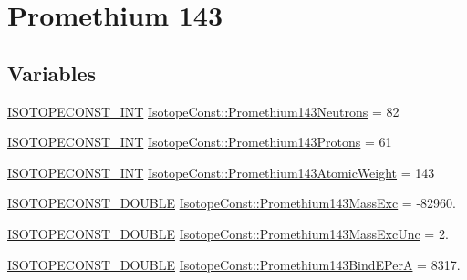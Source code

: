 \hypertarget{group___isotope_const-_promethium-_pm143}{}\section{Promethium 143}
\label{group___isotope_const-_promethium-_pm143}
\subsection*{Variables}
\begin{DoxyCompactItemize}
\item 
\mbox{\hyperlink{group___isotope_const-_macros_ga5f18360b3e99483a35c32d789e62621c}{I\+S\+O\+T\+O\+P\+E\+C\+O\+N\+S\+T\+\_\+\+I\+NT}} \mbox{\hyperlink{group___isotope_const-_promethium-_pm143_ga95c44e6529e52cbad17c35234598233a}{Isotope\+Const\+::\+Promethium143\+Neutrons}} = 82
\item 
\mbox{\hyperlink{group___isotope_const-_macros_ga5f18360b3e99483a35c32d789e62621c}{I\+S\+O\+T\+O\+P\+E\+C\+O\+N\+S\+T\+\_\+\+I\+NT}} \mbox{\hyperlink{group___isotope_const-_promethium-_pm143_ga49a61bb77ef2f5d0c76c5df9083b4a56}{Isotope\+Const\+::\+Promethium143\+Protons}} = 61
\item 
\mbox{\hyperlink{group___isotope_const-_macros_ga5f18360b3e99483a35c32d789e62621c}{I\+S\+O\+T\+O\+P\+E\+C\+O\+N\+S\+T\+\_\+\+I\+NT}} \mbox{\hyperlink{group___isotope_const-_promethium-_pm143_gaa507a319735b05d2bf0e0d992bcd7c50}{Isotope\+Const\+::\+Promethium143\+Atomic\+Weight}} = 143
\item 
\mbox{\hyperlink{group___isotope_const-_macros_ga8f45a7272ce02c0b4c65c44636ed719a}{I\+S\+O\+T\+O\+P\+E\+C\+O\+N\+S\+T\+\_\+\+D\+O\+U\+B\+LE}} \mbox{\hyperlink{group___isotope_const-_promethium-_pm143_ga00f3a88844f4f21c891968dc8cf4ecb2}{Isotope\+Const\+::\+Promethium143\+Mass\+Exc}} = -\/82960.
\item 
\mbox{\hyperlink{group___isotope_const-_macros_ga8f45a7272ce02c0b4c65c44636ed719a}{I\+S\+O\+T\+O\+P\+E\+C\+O\+N\+S\+T\+\_\+\+D\+O\+U\+B\+LE}} \mbox{\hyperlink{group___isotope_const-_promethium-_pm143_gafa32cee9524d3525f0ec45e425a4398c}{Isotope\+Const\+::\+Promethium143\+Mass\+Exc\+Unc}} = 2.
\item 
\mbox{\hyperlink{group___isotope_const-_macros_ga8f45a7272ce02c0b4c65c44636ed719a}{I\+S\+O\+T\+O\+P\+E\+C\+O\+N\+S\+T\+\_\+\+D\+O\+U\+B\+LE}} \mbox{\hyperlink{group___isotope_const-_promethium-_pm143_ga9c304aa726685d114064a81c3017e2ba}{Isotope\+Const\+::\+Promethium143\+Bind\+E\+PerA}} = 8317.

\end{DoxyCompactItemize}
